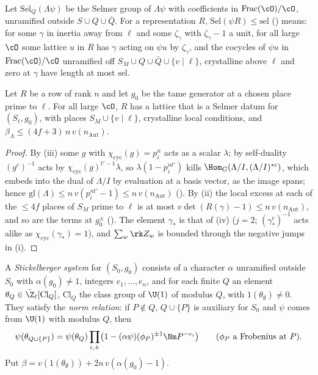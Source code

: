 Let $\mathrm{Sel}_Q(\Lambda\psi)$ be the Selmer group of $\Lambda\psi$ with coefficients in
$\mathrm{Frac}(\cO)/\cO$, unramified outside $S\cup Q\cup\bar Q$. For a representation $R$,
$\mathrm{Sel}(\psi R)\le\mathrm{sel}$ () means: for some $\gamma$ in
inertia away from $\ell$ and some $\zeta_\gamma$ with $\zeta_\gamma-1$ a unit, for all large $\cO$ some lattice $u$
in $R$ has $\gamma$ acting on $\psi u$ by $\zeta_\gamma$, and the cocycles of $\psi u$ in $\mathrm{Frac}(\cO)/\cO$ unramified off
$S_M\cup Q\cup\bar Q\cup\{v\mid\ell\}$, crystalline above $\ell$ and zero at $\gamma$ have length at
most $\mathrm{sel}$.

\begin{proposition}
\label{cg-selmer:prop:selmerdatum}
Let $R$ be a row of rank $n$ and let $g_0$ be the tame generator at a chosen place prime to $\ell$.
For all large $\cO$, $R$ has a lattice that is a Selmer datum for $(S_\ell,g_0)$, with places
$S_M\cup\{v\mid\ell\}$, crystalline local conditions, and $\beta_\Lambda\le(4f+3)\,n\,v(n_{\mathrm{Aut}})$.
\end{proposition}

\begin{proof}
By (iii) some $g$ with $\chi_{\mathrm{cyc}}(g)=p_i^n$ acts as a scalar $\lambda$; by self-duality $(g^c)^{-1}$ acts by
$\chi_{\mathrm{cyc}}(g)^{t'-1}\lambda$, so $\lambda(1-p_i^{nt'})$ kills $\Hom_G(\Lambda/I,(\Lambda/I)^{*c})$, which embeds into the
dual of $\Lambda/I$ by evaluation at a basis vector, as the image spans; hence
$\mathrm{gl}(\Lambda)\le n\,v(p_i^{nt'}-1)\le n\,v(n_{\mathrm{Aut}})$ (). By (ii) the
local excess at each of the $\le4f$ places of $S_M$ prime to $\ell$ is at most
$v\det(R(\gamma)-1)\le n\,v(n_{\mathrm{Aut}})$, and so are the terms at $g_0^\pm$
(). The element
$\gamma_*$ is that of (iv) ($j=2$; $(\gamma_*^c)^{-1}$ acts alike as $\chi_{\mathrm{cyc}}(\gamma_*)=1$), and
$\sum_w\rk Z_w$ is bounded through the negative jumps in (i).
\end{proof}

\begin{definition}\label{cg-selmer:def:stickel}
A \emph{Stickelberger system} for $(S_0,g_0)$ consists of a character $\alpha$ unramified outside
$S_0$ with $\alpha(g_0)\ne1$, integers $e_1,\dots,e_n$, and for each finite $Q$ an element
$\theta_Q\in\bar\Z_\ell[\mathrm{Cl}_Q]$, $\mathrm{Cl}_Q$ the class group of $\U(1)$ of modulus $Q$, with
$1(\theta_\emptyset)\ne0$. They satisfy the \emph{norm relation}: if $P\notin Q$, $Q\cup\{P\}$ is auxiliary for $S_0$ and $\psi$ comes from
$\U(1)$ with modulus $Q$, then
\[
  \psi(\theta_{Q\cup\{P\}})=\psi(\theta_Q)\prod_{i,\pm}\bigl(1-(\alpha\psi)(\phi_P)^{\pm1}
  \Nm P^{-e_i}\bigr)\qquad(\phi_P\text{ a Frobenius at }P).
\]
Put $\beta=v(1(\theta_\emptyset))+2n\,v(\alpha(g_0)-1)$.
\end{definition}

